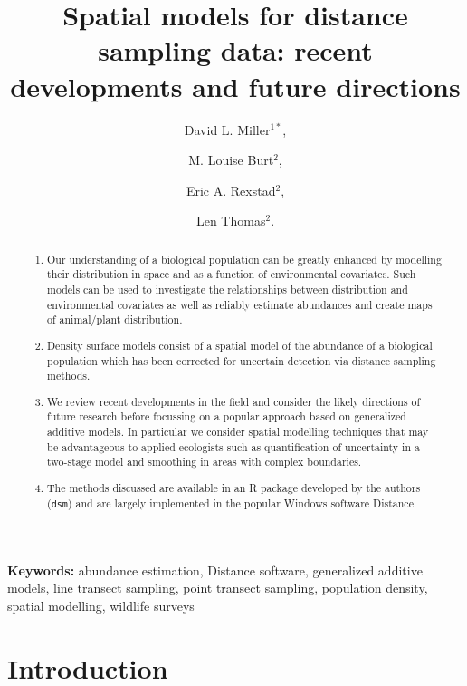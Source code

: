 \documentclass[a4paper,12pt]{article}
\title{Spatial models for distance sampling data: recent developments and future directions}
\author{
David L. Miller$^{1*}$, \and
M. Louise Burt$^{2}$, \and
Eric A. Rexstad$^{2}$, \and 
Len Thomas$^{2}$.}
\begin{document}
\maketitle

\begin{abstract}
  \noindent 

\begin{enumerate}
	\item Our understanding of a biological population can be greatly enhanced by modelling their distribution in space and as a function of environmental covariates. Such models can be used to investigate the relationships between distribution and environmental covariates as well as reliably estimate abundances and create maps of animal/plant distribution. 
	\item Density surface models consist of a spatial model of the abundance of a biological population which has been corrected for uncertain detection via distance sampling methods. 
	\item We review recent developments in the field and consider the likely directions of future research before focussing on a popular approach based on generalized additive models.  In particular we consider spatial modelling techniques that may be advantageous to applied ecologists such as quantification of uncertainty in a two-stage model and smoothing in areas with complex boundaries.
	\item The methods discussed are available in an \textsf{R} package developed by the authors (\texttt{dsm}) and are largely implemented in the popular Windows software Distance.
\end{enumerate}
 

\end{abstract}

\noindent \textbf{Keywords:} abundance estimation, Distance software, generalized additive models, line transect sampling, point transect sampling, population density, spatial modelling, wildlife surveys


\newpage

\section*{Introduction}
\label{s:intro}
\end{document}
